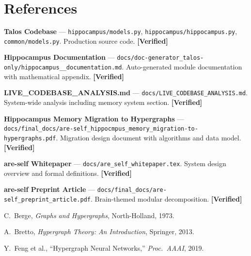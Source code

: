 \documentclass[11pt]{article}
\newcommand{\verified}{\textcolor{verifiedgreen}{\textbf{[Verified]}}}
\theoremstyle{definition}
\theoremstyle{remark}
\begin{document}
\section{References}
\label{sec:references}

\begin{enumerate}[label={[\arabic*]}, leftmargin=2.5em, nosep]
  \item \textbf{Talos Codebase} --- \texttt{hippocampus/models.py},
    \texttt{hippocampus/hippocampus.py}, \texttt{common/models.py}.
    Production source code. \verified{}

  \item \textbf{Hippocampus Documentation} ---
    \texttt{docs/doc-generator\_talos-only/hippocampus\_\_documentation.md}.
    Auto-generated module documentation with mathematical appendix. \verified{}

  \item \textbf{LIVE\_CODEBASE\_ANALYSIS.md} ---
    \texttt{docs/LIVE\_CODEBASE\_ANALYSIS.md}.
    System-wide analysis including memory system section. \verified{}


  \item \textbf{Hippocampus Memory Migration to Hypergraphs} ---
    \texttt{docs/final\_docs/are-self\_hippocmpus\_memory\_migration-to-hypergraphs.pdf}.
    Migration design document with algorithms and data model. \verified{}


  \item \textbf{are-self Whitepaper} ---
    \texttt{docs/are\_self\_whitepaper.tex}.
    System design overview and formal definitions. \verified{}

  \item \textbf{are-self Preprint Article} ---
    \texttt{docs/final\_docs/are-self\_preprint\_article.pdf}.
    Brain-themed modular decomposition. \verified{}

  \item C.~Berge, \textit{Graphs and Hypergraphs}, North-Holland, 1973.

  \item A.~Bretto, \textit{Hypergraph Theory: An Introduction},
    Springer, 2013.

  \item Y.~Feng et al., ``Hypergraph Neural Networks,''
    \textit{Proc.\ AAAI}, 2019.
\end{enumerate}
\end{document}
